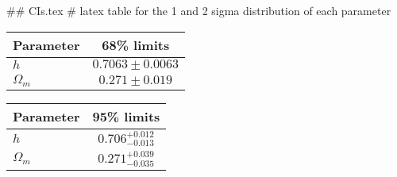 ## CIs.tex
# latex table for the 1 and 2 sigma distribution of each parameter

\begin{tabular} { l  c}
 Parameter &  68\% limits\\
\hline
{\boldmath$h              $} & $0.7063\pm 0.0063          $\\
{\boldmath$\Omega_m       $} & $0.271\pm 0.019            $\\
\hline
\end{tabular}

\begin{tabular} { l  c}
 Parameter &  95\% limits\\
\hline
{\boldmath$h              $} & $0.706^{+0.012}_{-0.013}   $\\
{\boldmath$\Omega_m       $} & $0.271^{+0.039}_{-0.035}   $\\
\hline
\end{tabular}
